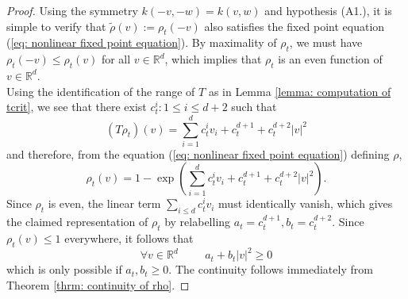 \begin{proof} Using the symmetry $k(-v,-w)=k(v,w)$ and hypothesis ({A1}.), it is simple to verify that $\tilde{\rho}(v):=\rho_t(-v)$ also satisfies the fixed point equation (\ref{eq: nonlinear fixed point equation}). By maximality of $\rho_t$, we must have $\rho_t(-v)\le \rho_t(v)$ for all $v\in \mathbb{R}^d$, which implies that $\rho_t$ is an even function of $v\in\mathbb{R}^d$. \medskip \\ Using the identification of the range of $T$ as in Lemma \ref{lemma: computation of tcrit}, we see that there exist $c^i_t: 1\le i\le d+2$ such that \begin{equation}
    (T\rho_t)(v)=\sum_{i=1}^d c^i_t v_i+ c^{d+1}_t +c^{d+2}_t|v|^2
\end{equation}and therefore, from the equation (\ref{eq: nonlinear fixed point equation}) defining $\rho$, \begin{equation}
    \rho_t(v)=1-\exp\left(\sum_{i=1}^d c^i_t v_i+ c^{d+1}_t +c^{d+2}_t|v|^2\right).
\end{equation} Since $\rho_t$ is even, the linear term $\sum_{i\le d} c^i_t v_i$ must identically vanish, which gives the claimed representation of $\rho_t$ by relabelling $a_t=c^{d+1}_t, b_t=c^{d+2}_t$. Since $\rho_t(v)\le 1$ everywhere, it follows that \begin{equation}
   \forall v \in \mathbb{R}^d\hspace{1cm} a_t+b_t|v|^2 \ge 0
\end{equation}which is only possible if $a_t, b_t\ge 0.$ The continuity follows immediately from Theorem \ref{thrm: continuity of rho}. \end{proof} 
